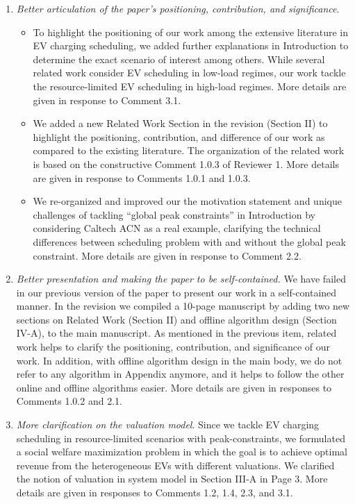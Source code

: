 \documentclass[11pt]{article}
\newcommand{\rev}[1]{{\color{black}#1}}%
\newcommand{\rev}[1]{#1}
\begin{document}
\begin{enumerate}
\item \textit{Better articulation of the paper's positioning, contribution, and significance}. 
\begin{itemize}
\item To highlight the positioning of our work among the extensive literature in EV charging scheduling, we added further explanations in Introduction to determine the exact scenario of interest among others. While several related work consider  EV scheduling in low-load regimes, our work tackle the resource-limited EV scheduling in high-load regimes. More details are given in response to Comment 3.1. 
\item We added a new Related Work Section in the revision (Section II) to highlight the positioning, contribution, and difference of our work as compared to the existing literature. The organization of the related work is based on the constructive Comment 1.0.3 of Reviewer 1. More details are given in response to Comments 1.0.1 and 1.0.3.
\item We re-organized and improved our the motivation statement and unique challenges of tackling ``global peak constraints'' in Introduction by considering Caltech ACN as a real example, \rev{clarifying the technical differences between scheduling problem with and without the global peak constraint}.  More details are given in response to Comment 2.2.
\end{itemize}
\item \textit{Better presentation and making the paper to be self-contained.} We have failed in our previous version of the paper to present our work in a self-contained manner. In the revision we compiled a 10-page manuscript by adding two new sections on Related Work (Section II) and offline algorithm design (Section IV-A), to the main manuscript. As mentioned in the previous item, related work helps to clarify the positioning, contribution, and significance of our work. In addition, with offline algorithm design in the main body, we do not refer to any algorithm in Appendix anymore, and it helps to follow the other online and offline algorithms easier. More details are given in responses to Comments 1.0.2 and 2.1. 

\item \textit{More clarification on the valuation model}. Since we tackle EV charging scheduling in resource-limited scenarios with peak-constraints, we formulated a \rev{social welfare maximization problem} in which the goal is to achieve optimal revenue from the heterogeneous EVs with different valuations. We clarified the notion of valuation in system model in Section III-A in Page 3. More details are given in responses to Comments 1.2, 1.4, 2.3, and 3.1.


\end{enumerate}
\end{document}
